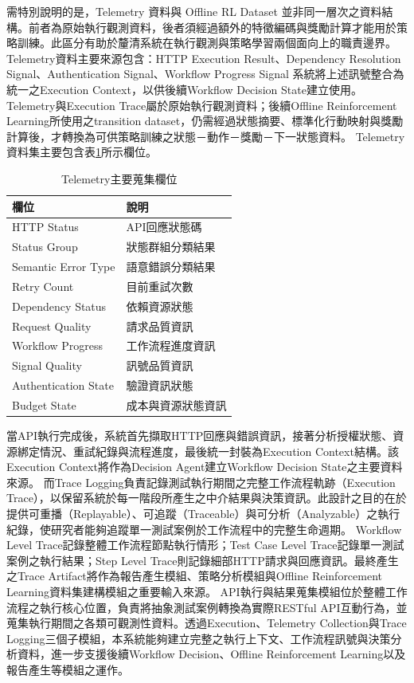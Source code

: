\begin{ZhChapter}
\begin{enumerate}
\end{enumerate}
\text 需特別說明的是，Telemetry 資料與 Offline RL Dataset 並非同一層次之資料結構。前者為原始執行觀測資料，後者須經過額外的特徵編碼與獎勵計算才能用於策略訓練。此區分有助於釐清系統在執行觀測與策略學習兩個面向上的職責邊界。
\text Telemetry資料主要來源包含：HTTP Execution Result、Dependency Resolution Signal、Authentication Signal、Workflow Progress Signal
\text 系統將上述訊號整合為統一之Execution Context，以供後續Workflow Decision State建立使用。Telemetry與Execution Trace屬於原始執行觀測資料；後續Offline Reinforcement Learning所使用之transition dataset，仍需經過狀態摘要、標準化行動映射與獎勵計算後，才轉換為可供策略訓練之狀態－動作－獎勵－下一狀態資料。
\text Telemetry資料集主要包含表\ref{tab:telemetry_fields}所示欄位。

\begin{table}[htbp]
\centering
\caption{Telemetry主要蒐集欄位}
\label{tab:telemetry_fields}
\renewcommand{\arraystretch}{1.3}
\begin{tabular}{p{4cm} p{10cm}}
\toprule
\textbf{欄位} & \textbf{說明} \\
\midrule
HTTP Status &
API回應狀態碼 \\
Status Group &
狀態群組分類結果 \\
Semantic Error Type &
語意錯誤分類結果 \\
Retry Count &
目前重試次數 \\
Dependency Status &
依賴資源狀態 \\
Request Quality &
請求品質資訊 \\
Workflow Progress &
工作流程進度資訊 \\
Signal Quality &
訊號品質資訊 \\
Authentication State &
驗證資訊狀態 \\
Budget State &
成本與資源狀態資訊 \\
\bottomrule
\end{tabular}
\end{table}

\text 當API執行完成後，系統首先擷取HTTP回應與錯誤資訊，接著分析授權狀態、資源綁定情況、重試紀錄與流程進度，最後統一封裝為Execution Context結構。該Execution Context將作為Decision Agent建立Workflow Decision State之主要資料來源。
\text 而Trace Logging負責記錄測試執行期間之完整工作流程軌跡（Execution Trace），以保留系統於每一階段所產生之中介結果與決策資訊。此設計之目的在於提供可重播（Replayable）、可追蹤（Traceable）與可分析（Analyzable）之執行紀錄，使研究者能夠追蹤單一測試案例於工作流程中的完整生命週期。
\text Workflow Level Trace記錄整體工作流程節點執行情形；Test Case Level Trace記錄單一測試案例之執行結果；Step Level Trace則記錄細部HTTP請求與回應資訊。最終產生之Trace Artifact將作為報告產生模組、策略分析模組與Offline Reinforcement Learning資料集建構模組之重要輸入來源。
\text API執行與結果蒐集模組位於整體工作流程之執行核心位置，負責將抽象測試案例轉換為實際RESTful API互動行為，並蒐集執行期間之各類可觀測性資料。透過Execution、Telemetry Collection與Trace Logging三個子模組，本系統能夠建立完整之執行上下文、工作流程訊號與決策分析資料，進一步支援後續Workflow Decision、Offline Reinforcement Learning以及報告產生等模組之運作。


\end{ZhChapter}
